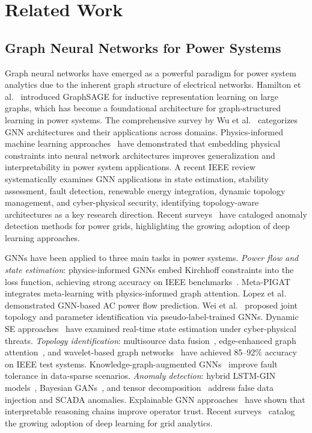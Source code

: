 \documentclass[research]{fcs}
\begin{document}
\section{Related Work}

\subsection{Graph Neural Networks for Power Systems}

Graph neural networks have emerged as a powerful paradigm for power system analytics due to the inherent graph structure of electrical networks. Hamilton et al.~\cite{hamilton2017inductive} introduced GraphSAGE for inductive representation learning on large graphs, which has become a foundational architecture for graph-structured learning in power systems. The comprehensive survey by Wu et al.~\cite{wu2021comprehensive} categorizes GNN architectures and their applications across domains. Physics-informed machine learning approaches~\cite{ieee_tsg_physics_ml} have demonstrated that embedding physical constraints into neural network architectures improves generalization and interpretability in power system applications. A recent IEEE review~\cite{gnn_nature_review2024} systematically examines GNN applications in state estimation, stability assessment, fault detection, renewable energy integration, dynamic topology management, and cyber-physical security, identifying topology-aware architectures as a key research direction. Recent surveys~\cite{sarker_ai_review2026} have cataloged anomaly detection methods for power grids, highlighting the growing adoption of deep learning approaches.

GNNs have been applied to three main tasks in power systems. \emph{Power flow and state estimation}: physics-informed GNNs embed Kirchhoff constraints into the loss function, achieving strong accuracy on IEEE benchmarks~\cite{physics_informed_gnn_se2023,tpgse2025,gnn_bddi_se2026}. Meta-PIGAT~\cite{meta_pigat_dsse2025} integrates meta-learning with physics-informed graph attention. Lopez et al.~\cite{lopez_opf_pitgnn2025} demonstrated GNN-based AC power flow prediction. Wei et al.~\cite{wei_pltgnn2025} proposed joint topology and parameter identification via pseudo-label-trained GNNs. Dynamic SE approaches~\cite{zhou_dynamic_se_cyber2024} have examined real-time state estimation under cyber-physical threats. \emph{Topology identification}: multisource data fusion~\cite{multisource_outage2025}, edge-enhanced graph attention~\cite{egat2025}, and wavelet-based graph networks~\cite{wavelet_gat_topo2025,garcia_wavelet_topo2025} have achieved 85--92\% accuracy on IEEE test systems. Knowledge-graph-augmented GNNs~\cite{expert_gnn_kg2025} improve fault tolerance in data-sparse scenarios. \emph{Anomaly detection}: hybrid LSTM-GIN models~\cite{jobe_lstm_gin2024}, Bayesian GANs~\cite{xu_bayesian_gan2024}, and tensor decomposition~\cite{tensor_scada2023} address false data injection and SCADA anomalies. Explainable GNN approaches~\cite{xgnn_fault2025,xai_cps2026} have shown that interpretable reasoning chains improve operator trust. Recent surveys~\cite{timeseries_anomaly_smartgrid2025,sarker_ai_review2026} catalog the growing adoption of deep learning for grid analytics.
\end{document}
